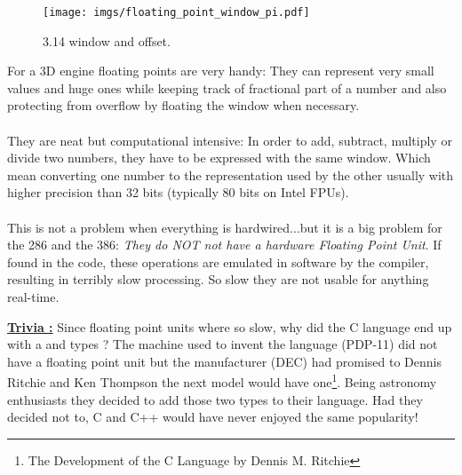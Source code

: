 \documentclass[book.tex]{subfiles}
\begin{document}
\begin{figure}[H]
\centering
\texttt{[image: imgs/floating\_point\_window\_pi.pdf]}

\caption{3.14 window and offset.}
\label{fig:fp_internals}
\end{figure}
  \bigskip

For a 3D engine floating points are very handy: They can represent very small values and huge ones while keeping track of fractional part of a number and also protecting from overflow by floating the window when necessary.\\
\\
They are neat but computational intensive: In order to add, subtract, multiply or divide two numbers, they have to be expressed with the same window. Which mean converting one number to the representation used by the other usually with higher precision than 32 bits (typically 80 bits on Intel FPUs).\\
\\
This is not a problem when everything is hardwired...but it is a big problem for the 286 and the 386: \emph{They do NOT not have a hardware Floating Point Unit}. If found in the code, these operations are emulated in software by the compiler, resulting in terribly slow processing. So slow they are not usable for anything real-time.\\ 
\par


 \textbf{\underline{Trivia :}} Since floating point units where so slow, why did the C language end up with a  and  types ? The machine used to invent the language (PDP-11) did not have a floating point unit but the manufacturer (DEC) had promised to Dennis Ritchie and Ken Thompson the next model would have one\footnote{The Development of the C Language by Dennis M. Ritchie}. Being astronomy enthusiasts they decided to add those two types to their language. Had they decided not to, C and C++ would have never enjoyed the same popularity!\\
\par
\end{document}
